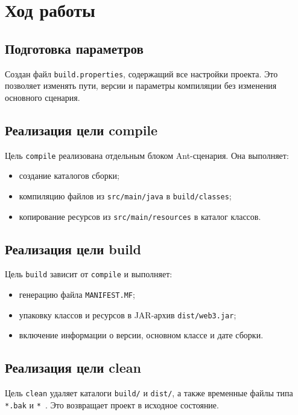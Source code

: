 \documentclass[12pt]{article}
\begin{document}
\section{Ход работы}

\subsection{Подготовка параметров}

Создан файл \texttt{build.properties}, содержащий все настройки проекта. Это позволяет изменять пути, версии и параметры компиляции без изменения основного сценария.

\subsection{Реализация цели compile}

Цель \texttt{compile} реализована отдельным блоком Ant-сценария. Она выполняет:

\begin{itemize}[leftmargin=1.5em]
    \item создание каталогов сборки;
    \item компиляцию файлов из \texttt{src/main/java} в \texttt{build/classes};
    \item копирование ресурсов из \texttt{src/main/resources} в каталог классов.
\end{itemize}

\subsection{Реализация цели build}

Цель \texttt{build} зависит от \texttt{compile} и выполняет:

\begin{itemize}[leftmargin=1.5em]
    \item генерацию файла \texttt{MANIFEST.MF};
    \item упаковку классов и ресурсов в JAR-архив \texttt{dist/web3.jar};
    \item включение информации о версии, основном классе и дате сборки.
\end{itemize}

\subsection{Реализация цели clean}

Цель \texttt{clean} удаляет каталоги \texttt{build/} и \texttt{dist/}, а также временные файлы типа \texttt{*.bak} и \texttt{*~}. Это возвращает проект в исходное состояние.
\end{document}
